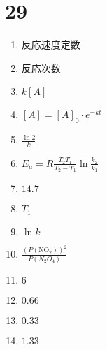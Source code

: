 \documentclass[dvipdfmx]{article}
\begin{document}
    \section*{29}
    \begin{enumerate}
      \item 反応速度定数
      \item 反応次数
      \item $k[A]$
      \item $[A] = [A]_0 \cdot e^{-kt}$
      \item $\frac{\ln 2}{k}$
      \item $E_a = R\frac{T_2 T_1}{T_2 - T_1} \ln \frac{k_2}{k_1}$
      \item $14.7$
      \item $T_1$
      \item $\ln k$
      \item $\frac{(P(\mathrm{NO_2}))^2}{P(N_2O_4)}$
      \item $6$
      \item $0.66$
      \item $0.33$
      \item $1.33$
    \end{enumerate}
\end{document}

